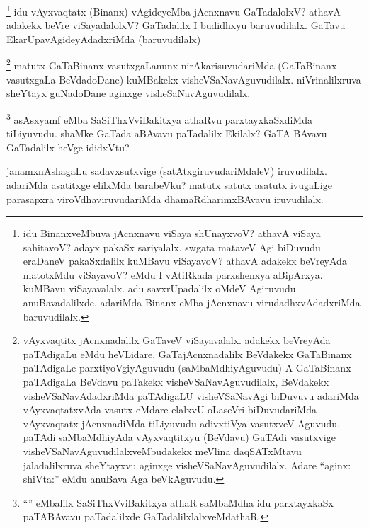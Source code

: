 \begin{artha}
\footnote{idu BinanxveMbuva jAcnxnavu viSaya shUnayxvoV? athavA viSaya sahitavoV? adayx pakaSx sariyalalx. swgata mataveV Agi biDuvudu eraDaneV pakaSxdalilx kuMBavu viSayavoV? athavA adakekx beVreyAda matotxMdu viSayavoV? eMdu I vAtiRkada parxshenxya aBipArxya. kuMBavu viSayavalalx. adu savxrUpadalilx oMdeV Agiruvudu anuBavadalilxde. adariMda Binanx eMba jAcnxnavu virudadhxvAdadxriMda baruvudilalx.}
idu vAyxvaqtatx (Binanx) vAgideyeMba jAcnxnavu GaTadalolxV? athavA adakekx beVre viSayadalolxV? GaTadalilx I budidhxyu baruvudilalx. GaTavu EkarUpavAgideyAdadxriMda (baruvudilalx)
\end{artha}

\begin{artha}
\footnote{vAyxvaqtitx jAcnxnadalilx GaTaveV viSayavalalx. adakekx beVreyAda paTAdigaLu eMdu heVLidare, GaTajAcnxnadalilx BeVdakekx GaTaBinanx paTAdigaLe parxtiyoVgiyAguvudu (saMbaMdhiyAguvudu) A GaTaBinanx paTAdigaLa BeVdavu paTakekx visheVSaNavAguvudilalx, BeVdakekx visheVSaNavAdadxriMda paTAdigaLU visheVSaNavAgi biDuvuvu adariMda vAyxvaqtatxvAda vasutx eMdare elalxvU oLaseVri biDuvudariMda vAyxvaqtatx jAcnxnadiMda tiLiyuvudu adivxtiVya vasutxveV Aguvudu. paTAdi saMbaMdhiyAda vAyxvaqtitxyu (BeVdavu) GaTAdi vasutxvige visheVSaNavAguvudilalxveMbudakekx meVlina daqSATxMtavu jaladalilxruva sheYtayxvu aginxge visheVSaNavAguvudilalx. Adare ``aginx: shiVta:'' eMdu anuBava Aga beVkAguvudu.}
matutx GaTaBinanx vasutxgaLanunx nirAkarisuvudariMda (GaTaBinanx vasutxgaLa BeVdadoDane) kuMBakekx visheVSaNavAguvudilalx. niVrinalilxruva sheYtayx guNadoDane aginxge visheSaNavAguvudilalx.
\end{artha}


\begin{artha}
\footnote{``\stext'' eMbalilx SaSiThxVviBakitxya athaR saMbaMdha idu parxtayxkaSx paTABAvavu paTadalilxde GaTadalilxlalxveMdathaR.}
asAsxyamf eMba SaSiThxVviBakitxya athaRvu parxtayxkaSxdiMda tiLiyuvudu. shaMke GaTada aBAvavu paTadalilx Ekilalx? GaTA BAvavu GaTadalilx heVge ididxVtu?
\end{artha}


\begin{artha}
janamxnAshagaLu sadavxsutxvige (satAtxgiruvudariMdaleV) iruvudilalx. adariMda asatitxge elilxMda barabeVku? matutx satutx asatutx ivugaLige parasapxra viroVdhaviruvudariMda dhamaRdharimxBAvavu iruvudilalx.
\end{artha}

